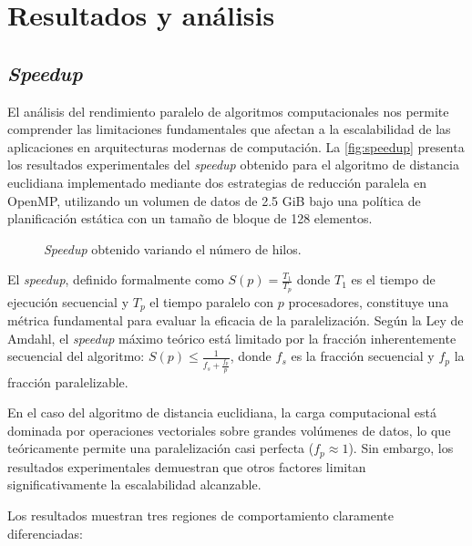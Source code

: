 \newpage

\section{Resultados y análisis}

    \subsection{\textit{Speedup}}
    
        El análisis del rendimiento paralelo de algoritmos computacionales nos permite comprender las limitaciones fundamentales que afectan a la escalabilidad de las aplicaciones en arquitecturas modernas de computación. La \autoref{fig:speedup} presenta los resultados experimentales del \textit{speedup} obtenido para el algoritmo de distancia euclidiana implementado mediante dos estrategias de reducción paralela en OpenMP, utilizando un volumen de datos de 2.5 GiB bajo una política de planificación estática con un tamaño de bloque de 128 elementos.

        \begin{figure}[H]
            \centering
            \caption{\textit{Speedup} obtenido variando el número de hilos.}
            \label{fig:speedup}
        \end{figure}
                
        El \textit{speedup}, definido formalmente como $S(p) = \frac{T_1}{T_p}$ donde $T_1$ es el tiempo de ejecución secuencial y $T_p$ el tiempo paralelo con $p$ procesadores, constituye una métrica fundamental para evaluar la eficacia de la paralelización. Según la Ley de Amdahl, el \textit{speedup} máximo teórico está limitado por la fracción inherentemente secuencial del algoritmo: $S(p) \leq \frac{1}{f_s + \frac{f_p}{p}}$, donde $f_s$ es la fracción secuencial y $f_p$ la fracción paralelizable.
        
        En el caso del algoritmo de distancia euclidiana, la carga computacional está dominada por operaciones vectoriales sobre grandes volúmenes de datos, lo que teóricamente permite una paralelización casi perfecta ($f_p \approx 1$). Sin embargo, los resultados experimentales demuestran que otros factores limitan significativamente la escalabilidad alcanzable.

        Los resultados muestran tres regiones de comportamiento claramente diferenciadas:

